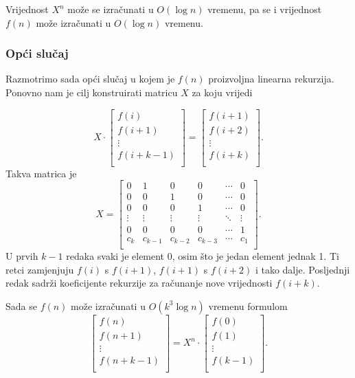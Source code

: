 Vrijednost $X^n$ može se izračunati u
$O(\log n)$ vremenu,
pa se i vrijednost $f(n)$ može izračunati
u $O(\log n)$ vremenu.

\subsubsection{Opći slučaj}

Razmotrimo sada opći slučaj u kojem je
$f(n)$ proizvoljna linearna rekurzija.
Ponovno nam je cilj konstruirati matricu $X$
za koju vrijedi

\[ X \cdot
 \begin{bmatrix}
  f(i) \\
  f(i+1) \\
  \vdots \\
  f(i+k-1) \\
 \end{bmatrix}
=
 \begin{bmatrix}
  f(i+1) \\
  f(i+2) \\
  \vdots \\
  f(i+k) \\
 \end{bmatrix}.
\]
Takva matrica je
\[
X =
 \begin{bmatrix}
  0 & 1 & 0 & 0 & \cdots & 0 \\
  0 & 0 & 1 & 0 & \cdots & 0 \\
  0 & 0 & 0 & 1 & \cdots & 0 \\
  \vdots & \vdots & \vdots & \vdots & \ddots & \vdots \\
  0 & 0 & 0 & 0 & \cdots & 1 \\
  c_k & c_{k-1} & c_{k-2} & c_{k-3} & \cdots & c_1 \\
 \end{bmatrix}.
\]
U prvih $k-1$ redaka svaki je element 0,
osim što je jedan element jednak 1.
Ti retci zamjenjuju $f(i)$ s $f(i+1)$,
$f(i+1)$ s $f(i+2)$ i tako dalje.
Posljednji redak sadrži koeficijente rekurzije
za računanje nove vrijednosti $f(i+k)$.

\begin{samepage}
Sada se $f(n)$ može izračunati u
$O(k^3 \log n)$ vremenu formulom
\[
 \begin{bmatrix}
  f(n) \\
  f(n+1) \\
  \vdots \\
  f(n+k-1) \\
 \end{bmatrix}
=
X^n \cdot
 \begin{bmatrix}
  f(0) \\
  f(1) \\
  \vdots \\
  f(k-1) \\
 \end{bmatrix}.
\]
\end{samepage}

